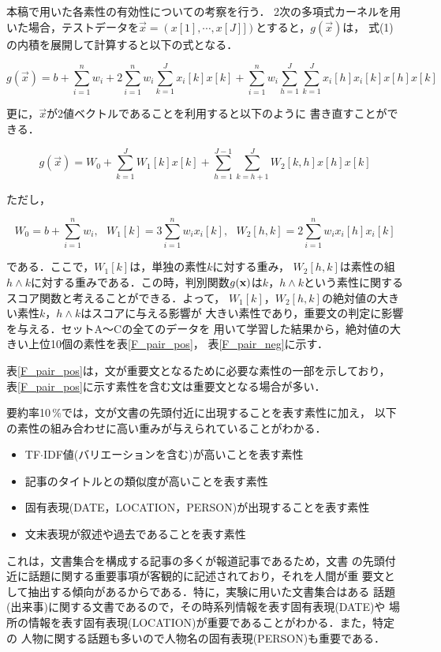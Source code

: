 本稿で用いた各素性の有効性についての考察を行う．
2次の多項式カーネルを用いた場合，テストデータを$ \vec x =
(x[1],\cdots,x[J]])$とすると，$g(\vec x)$は，
式(1)の内積を展開して計算すると以下の式となる．

\begin{equation}
g(\vec x) = b + \sum_{i=1}^{n} w_i + 2 \sum_{i=1}^{n} w_i \sum_{k=1}^J x_i[k] x[k] + \sum_{i=1}^{n} w_i \sum_{h=1}^{J}\sum_{k=1}^J x_i[h] x_i[k] x[h]
x[k]
\end{equation}

\noindent 更に，$ \vec x$が2値ベクトルであることを利用すると以下のように
書き直すことができる．

\begin{equation}
g(\vec x) = W_0 + \sum_{k=1}^J W_1[k] x[k] + \sum_{h=1}^{J-1}\sum_{k=h+1}^J W_2[k,h] x[h] x[k]
\end{equation}

\noindent ただし，

\[
W_0 = b+\sum_{i=1}^{n} w_i,~~~W_1[k] = 3\sum_{i=1}^{n}w_i
x_i[k],~~~W_2[h,k] = 2\sum_{i=1}^{n} w_i x_i[h] x_i[k]
\]

\noindent である．ここで，$W_1[k]$は，単独の素性$k$に対する重み，
$W_2[h,k]$は素性の組$h \land k$に対する重みである．この時，判別関数$g({\bf
x})$は$k$，$h \land k$という素性に関するスコア関数と考えることができる．よって，
$W_1[k]$，$W_2[h,k]$の絶対値の大きい素性$k$，$h \land k$はスコアに与える影響が
大きい素性であり，重要文の判定に影響を与える．セットA〜Cの全てのデータを
用いて学習した結果から，絶対値の大きい上位10個の素性を表\ref{F_pair_pos}，
表\ref{F_pair_neg}に示す．

表\ref{F_pair_pos}は，文が重要文となるために必要な素性の一部を示しており，
表\ref{F_pair_pos}に示す素性を含む文は重要文となる場合が多い．

要約率10\,\%では，文が文書の先頭付近に出現することを表す素性に加え，
以下の素性の組み合わせに高い重みが与えられていることがわかる．

\begin{itemize}
 \item TF$\cdot$IDF値(バリエーションを含む)が高いことを表す素性
 \item 記事のタイトルとの類似度が高いことを表す素性
 \item 固有表現(DATE，LOCATION，PERSON)が出現することを表す素性
 \item 文末表現が叙述や過去であることを表す素性
\end{itemize}

\noindent これは，文書集合を構成する記事の多くが報道記事であるため，文書
の先頭付近に話題に関する重要事項が客観的に記述されており，それを人間が重
要文として抽出する傾向があるからである．特に，実験に用いた文書集合はある
話題(出来事)に関する文書であるので，その時系列情報を表す固有表現(DATE)や
場所の情報を表す固有表現(LOCATION)が重要であることがわかる．また，特定の
人物に関する話題も多いので人物名の固有表現(PERSON)も重要である．


